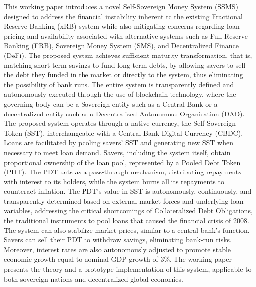 This working paper introduces a novel Self-Sovereign Money System (SSMS) designed to address the financial instability inherent to the existing Fractional Reserve Banking (xRB) system while also mitigating concerns regarding loan pricing and availability associated with alternative systems such as Full Reserve Banking (FRB), Sovereign Money System (SMS), and Decentralized Finance (DeFi). The proposed system achieves sufficient maturity transformation, that is, matching short-term savings to fund long-term debts, by allowing savers to sell the debt they funded in the market or directly to the system, thus eliminating the possibility of bank runs. The entire system is transparently defined and autonomously executed through the use of blockchain technology, where the governing body can be a Sovereign entity such as a Central Bank or a decentralized entity such as a Decentralized Autonomous Organisation (DAO). The proposed system operates through a native currency, the Self-Sovereign Token (SST), interchangeable with a Central Bank Digital Currency (CBDC). Loans are facilitated by pooling savers' SST and generating new SST when necessary to meet loan demand. Savers, including the system itself, obtain proportional ownership of the loan pool, represented by a Pooled Debt Token (PDT). The PDT acts as a pass-through mechanism, distributing repayments with interest to its holders, while the system burns all its repayments to counteract inflation. The PDT's value in SST is autonomously, continuously, and transparently determined based on external market forces and underlying loan variables, addressing the critical shortcomings of Collateralized Debt Obligations, the traditional instruments to pool loans that caused the financial crisis of 2008. The system can also stabilize market prices, similar to a central bank's function. Savers can sell their PDT to withdraw savings, eliminating bank-run risks. Moreover, interest rates are also autonomously adjusted to promote stable economic growth equal to nominal GDP growth of 3\%. The working paper presents the theory and a prototype implementation of this system, applicable to both sovereign nations and decentralized global economies.
